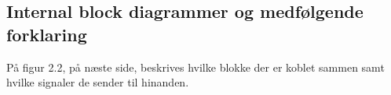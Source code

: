 
\subsection{Internal block diagrammer og medfølgende forklaring}

På figur 2.2, på næste side, beskrives hvilke blokke der er koblet sammen samt hvilke
signaler de sender til hinanden.







